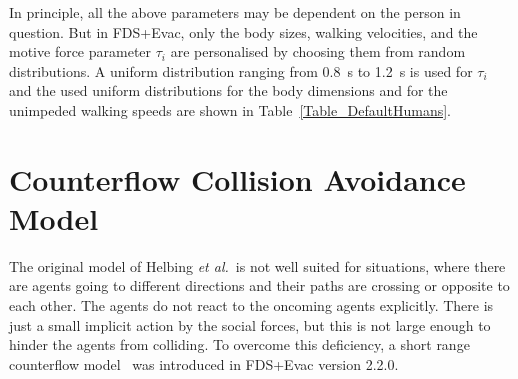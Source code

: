 \documentclass[12pt,a4paper,final,twoside]{stylevk}
\begin{document}

In principle, all the above parameters may be dependent on the person
in question.  But in FDS+Evac, only the body sizes, walking
velocities, and the motive force parameter $\tau_i$ are personalised
by choosing them from random distributions.  A uniform distribution
ranging from 0.8~s to 1.2~s is used for $\tau_i$ and the used uniform
distributions for the body dimensions and for the unimpeded walking
speeds are shown in Table~\ref{Table_DefaultHumans}.


\section{Counterflow Collision Avoidance Model}\label{Sec_CF_Model}

\noindent The original model of Helbing \emph{et al.}\ is not well
suited for situations, where there are agents going to different
directions and their paths are crossing or opposite to each other.
The agents do not react to the oncoming agents explicitly.  There is
just a small implicit action by the social forces, but this is not
large enough to hinder the agents from colliding.  To overcome this
deficiency, a short range counterflow model~\cite{Heliovaara12} was
introduced in FDS+Evac version 2.2.0.
\end{document}
